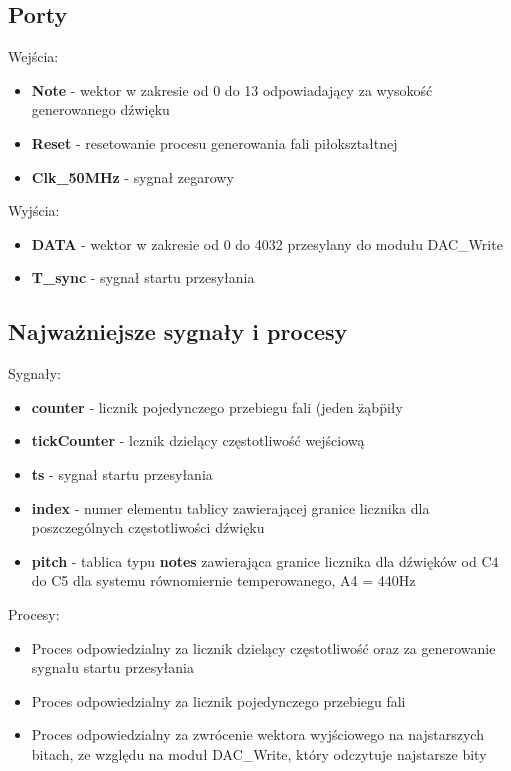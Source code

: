 \documentclass[a4paper]{report}
\begin{document}
		\subsection{Porty}
		{\Large Wejścia:}
			\begin{itemize}	 
				\item \textbf{Note} - wektor w zakresie od 0 do 13 odpowiadający za wysokość generowanego dźwięku
				\item \textbf{Reset} - resetowanie procesu generowania fali piłokształtnej
				\item \textbf{Clk\_50MHz} - sygnał zegarowy
			\end{itemize}
		{\Large Wyjścia:}
			\begin{itemize} 
				\item \textbf{DATA} - wektor w zakresie od 0 do 4032 przesylany do modułu DAC\_Write
				\item \textbf{T\_sync} - sygnał startu przesyłania
			\end{itemize}
		\subsection{Najważniejsze sygnały i procesy}
		{\Large Sygnały:}
			\begin{itemize}
				\item \textbf{counter} - licznik pojedynczego przebiegu fali (jeden \"ząb\" piły
				\item \textbf{tickCounter} - lcznik dzielący częstotliwość wejściową
				\item \textbf{ts} - sygnał startu przesyłania
				\item \textbf{index} - numer elementu tablicy zawierającej granice licznika dla poszczególnych częstotliwości dźwięku
				\item \textbf{pitch} - tablica typu \textbf{notes} zawierająca granice licznika dla dźwięków od C4 do C5 dla systemu równomiernie temperowanego, A4 = 440Hz
			\end{itemize}
		{\Large Procesy:}
			\begin{itemize}
			\item Proces odpowiedzialny za licznik dzielący częstotliwość oraz za generowanie sygnału startu przesyłania\\
				
			\item Proces odpowiedzialny za licznik pojedynczego przebiegu fali\\
				
			\item Proces odpowiedzialny za zwrócenie wektora wyjściowego na najstarszych bitach, ze względu na moduł DAC\_Write, który odczytuje najstarsze bity\\
				
			\end{itemize}
		
\end{document}
